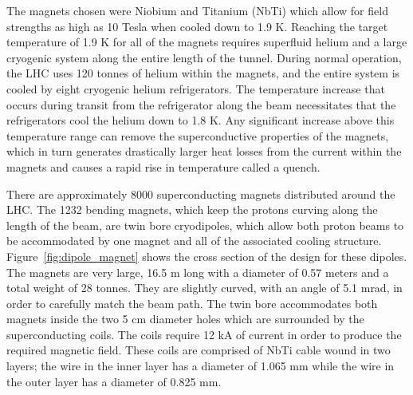 The magnets chosen were Niobium and Titanium (NbTi) which allow for field strengths as high as 10 Tesla when cooled down to 1.9 K.
Reaching the target temperature of  1.9 K for all of the magnets requires superfluid helium and a large cryogenic system along the entire length of the tunnel.
During normal operation, the \ac{LHC} uses 120 tonnes of helium within the magnets, and the entire system is cooled by eight cryogenic helium refrigerators.
The temperature increase that occurs during transit from the refrigerator along the beam necessitates that the refrigerators cool the helium down to 1.8 K.
Any significant increase above this temperature range can remove the superconductive properties of the magnets, which in turn generates drastically larger heat losses from the current within the magnets and causes a rapid rise in temperature called a quench.

There are approximately 8000 superconducting magnets distributed around the \ac{LHC}.
The 1232 bending magnets, which keep the protons curving along the length of the beam, are twin bore cryodipoles, which allow both proton beams to be accommodated by one magnet and all of the associated cooling structure.
Figure~\ref{fig:dipole_magnet} shows the cross section of the design for these dipoles. 
The magnets are very large, 16.5 m long with a diameter of 0.57 meters and a total weight of 28 tonnes. 
They are slightly curved, with an angle of 5.1 mrad, in order to carefully match the beam path.
The twin bore accommodates both magnets inside the two 5 cm diameter holes which are surrounded by the superconducting coils.
The coils require 12 kA of current in order to produce the required magnetic field.
These coils are comprised of NbTi cable wound in two layers; the wire in the inner layer has a diameter of 1.065 mm while the wire in the outer layer has a diameter of 0.825 mm. 

